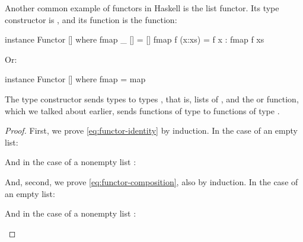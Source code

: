 \begin{example}
  \label{ex:functor-list-haskell}


  Another common example of functors in Haskell is the list functor.
  Its type constructor is \texthaskell{[]}, and its 
  function is the  function:
  \begin{codehaskell}
instance Functor [] where
  fmap _ []     = []
  fmap f (x:xs) = f x : fmap f xs
  \end{codehaskell}
  Or:
  \begin{codehaskell}
instance Functor [] where
  fmap = map
  \end{codehaskell}
  The \texthaskell{[]} type constructor sends types  to
  types \texthaskell{[a]}, that is, lists of , and the
   or  function, which we talked
  about earlier, sends functions of type  to
  functions of type \texthaskell{[a] -> [b]}.

  \begin{proof}

    First, we prove \eqref{eq:functor-identity} by induction. In the
    case of an empty list:
    \begin{steps}
      \steph{[]}
    \end{steps}
    And in the case of a nonempty list :
    \begin{steps}
        \eqbyihh{}
    \end{steps}
    And, second, we prove \eqref{eq:functor-composition}, also by
    induction. In the case of an empty list:
    \begin{steps}
      \steph{[]}
    \end{steps}
    And in the case of a nonempty list :
    \begin{steps}
        \eqbyihh{}
    \end{steps}

  \end{proof}

\end{example}

